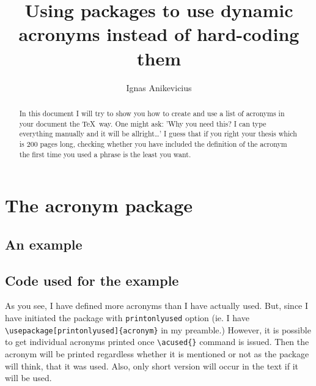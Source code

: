 

\usepackage[version=3]{mhchem}
\usepackage[printonlyused]{acronym}
\usepackage[xindy]{glossaries}

\title{Using packages to use dynamic acronyms instead of hard-coding them}
\author{Ignas Anikevicius}


\maketitle

\begin{abstract}
    In this document I will try to show you how to create and use a list of acronyms
    in your document the \TeX\ way. One might ask: 'Why you need this? I can type
    everything manually and it will be allright\ldots' I guess that if you right
    your thesis which is 200 pages long, checking whether you have included the
    definition of the acronym the first time you used a phrase is the least you
    want.
\end{abstract}

\tableofcontents

\section{The acronym package}

\subsection{An example}



\subsection{Code used for the example}



As you see, I have defined more acronyms than I have actually used. But, since I
have initiated the package with \verb|printonlyused| option (ie. I have
\verb|\usepackage[printonlyused]{acronym}| in my preamble.) However, it is
possible to get individual acronyms printed once \verb|\acused{}| command is
issued. Then the acronym will be printed regardless whether it is mentioned or
not as the package will think, that it was used. Also, only short version will
occur in the text if it will be used.

